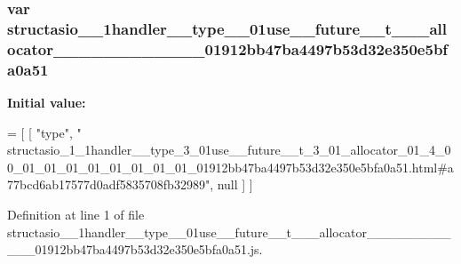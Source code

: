 \subsubsection[{structasio\+\_\+1\+\_\+1handler\+\_\+\+\_\+type\+\_\+3\+\_\+01use\+\_\+\+\_\+future\+\_\+\+\_\+t\+\_\+3\+\_\+01\+\_\+allocator\+\_\+01\+\_\+4\+\_\+00\+\_\+01\+\_\+01\+\_\+01\+\_\+01\+\_\+01\+\_\+01\+\_\+01\+\_\+01\+\_\+01912bb47ba4497b53d32e350e5bfa0a51}]{\setlength{\rightskip}{0pt plus 5cm}var structasio\+\_\+\_\+1handler\+\_\+\+\_\+type\+\_\+\_\+01use\+\_\+\+\_\+future\+\_\+\+\_\+t\+\_\+\_\+\_\+allocator\+\_\+\_\+\_\+\_\+\_\+\_\+\_\+\_\+\_\+\_\+\_\+\_\+01912bb47ba4497b53d32e350e5bfa0a51}\label{structasio__1__1handler____type__3__01use____future____t__3__01__allocator__01__4__00__01__01__0b458042eb63793051fb749e5370b64c7_a3e67da56cc7d35774eb88f697cfbac3a}
{\bfseries Initial value\+:}
\begin{DoxyCode}
=
[
    [ \textcolor{stringliteral}{"type"}, \textcolor{stringliteral}{"
      structasio\_1\_1handler\_\_type\_3\_01use\_\_future\_\_t\_3\_01\_allocator\_01\_4\_00\_01\_01\_01\_01\_01\_01\_01\_01\_01912bb47ba4497b53d32e350e5bfa0a51.html#a77bcd6ab17577d0adf5835708fb32989"}, null ]
]
\end{DoxyCode}


Definition at line 1 of file structasio\+\_\+\_\+1handler\+\_\+\+\_\+type\+\_\+\_\+01use\+\_\+\+\_\+future\+\_\+\+\_\+t\+\_\+\_\+\_\+allocator\+\_\+\_\+\_\+\_\+\_\+\_\+\_\+\_\+\_\+\_\+\_\+\_\+01912bb47ba4497b53d32e350e5bfa0a51.\+js.

